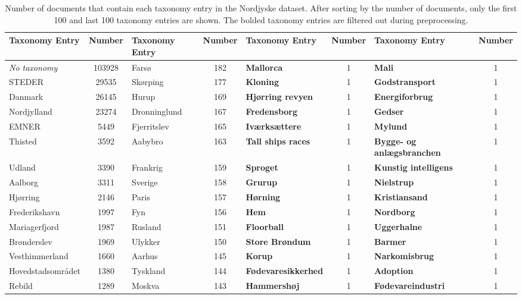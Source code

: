 \begin{table*}[h]
	\caption{Number of documents that contain each taxonomy entry in the Nordjyske dataset.
	After sorting by the number of documents, only the first 100 and last 100 taxonomy entries are shown.
	The bolded taxonomy entries are filtered out during preprocessing.}
	\label{tab:taxonomy_table}
	\centering
	\scriptsize
	\begin{tabular}{l|c|l|c|l|c|l|c}
		Taxonomy Entry & Number & Taxonomy Entry                    & Number & Taxonomy Entry                       & Number & Taxonomy Entry                      & Number \\
		\midrule
		\emph{No taxonomy} & 103928 & Farsø & 182 & \textbf{Mallorca} & 1 & \textbf{Mali} & 1 \\
		STEDER & 29535 & Skørping & 177 & \textbf{Kloning} & 1 & \textbf{Godstransport} & 1 \\
		Danmark & 26145 & Hurup & 169 & \textbf{Hjørring revyen} & 1 & \textbf{Energiforbrug} & 1 \\
		Nordjylland & 23274 & Dronninglund & 167 & \textbf{Fredensborg} & 1 & \textbf{Gedser} & 1 \\
		EMNER & 5449 & Fjerritslev & 165 & \textbf{Iværksættere} & 1 & \textbf{Mylund} & 1 \\
		Thisted & 3592 & Aabybro & 163 & \textbf{Tall ships races} & 1 & \textbf{Bygge- og anlægsbranchen} & 1 \\
		Udland & 3390 & Frankrig & 159 & \textbf{Sproget} & 1 & \textbf{Kunstig intelligens} & 1 \\
		Aalborg & 3311 & Sverige & 158 & \textbf{Grurup} & 1 & \textbf{Nielstrup} & 1 \\
		Hjørring & 2146 & Paris & 157 & \textbf{Hørning} & 1 & \textbf{Kristiansand} & 1 \\
		Frederikshavn & 1997 & Fyn & 156 & \textbf{Hem} & 1 & \textbf{Nordborg} & 1 \\
		Mariagerfjord & 1987 & Rusland & 151 & \textbf{Floorball} & 1 & \textbf{Uggerhalne} & 1 \\
		Brønderslev & 1969 & Ulykker & 150 & \textbf{Store Brøndum} & 1 & \textbf{Barmer} & 1 \\
		Vesthimmerland & 1660 & Aarhus & 145 & \textbf{Korup} & 1 & \textbf{Narkomisbrug} & 1 \\
		Hovedstadsområdet & 1380 & Tyskland & 144 & \textbf{Fødevaresikkerhed} & 1 & \textbf{Adoption} & 1 \\
		Rebild & 1289 & Moskva & 143 & \textbf{Hammershøj} & 1 & \textbf{Fødevareindustri} & 1 \\

\end{tabular}
\end{table*}

